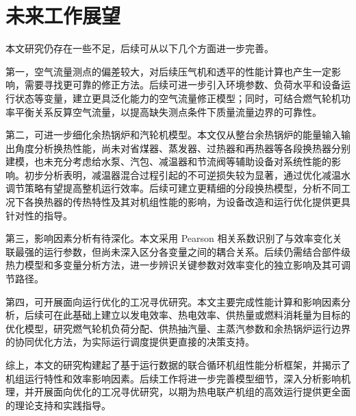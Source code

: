 \section{未来工作展望}

本文研究仍存在一些不足，后续可从以下几个方面进一步完善。

第一，空气流量测点的偏差较大，对后续压气机和透平的性能计算也产生一定影响，需要寻找更可靠的修正方法。后续可进一步引入环境参数、负荷水平和设备运行状态等变量，建立更具泛化能力的空气流量修正模型；同时，可结合燃气轮机功率平衡关系反算空气流量，以提高缺失测点条件下质量流量边界的可靠性。

第二，可进一步细化余热锅炉和汽轮机模型。本文仅从整台余热锅炉的能量输入输出角度分析换热性能，尚未对省煤器、蒸发器、过热器和再热器等各段换热器分别建模，也未充分考虑给水泵、汽包、减温器和节流阀等辅助设备对系统性能的影响。初步分析表明，减温器混合过程引起的不可逆损失较为显著，通过优化减温水调节策略有望提高整机运行效率。后续可建立更精细的分段换热模型，分析不同工况下各换热器的传热特性及其对机组性能的影响，为设备改造和运行优化提供更具针对性的指导。

第三，影响因素分析有待深化。本文采用 Pearson 相关系数识别了与效率变化关联最强的运行参数，但尚未深入区分各变量之间的耦合关系。后续仍需结合部件级热力模型和多变量分析方法，进一步辨识关键参数对效率变化的独立影响及其可调节路径。

第四，可开展面向运行优化的工况寻优研究。本文主要完成性能计算和影响因素分析，后续可在此基础上建立以发电效率、热电效率、供热量或燃料消耗量为目标的优化模型，研究燃气轮机负荷分配、供热抽汽量、主蒸汽参数和余热锅炉运行边界的协同优化方法，为实际运行调度提供更直接的决策支持。

综上，本文的研究构建起了基于运行数据的联合循环机组性能分析框架，并揭示了机组运行特性和效率影响因素。后续工作将进一步完善模型细节，深入分析影响机理，并开展面向优化的工况寻优研究，以期为热电联产机组的高效运行提供更全面的理论支持和实践指导。
